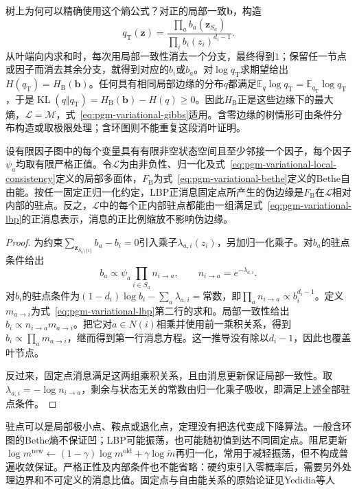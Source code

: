 树上为何可以精确使用这个熵公式？对正的局部一致$\bm b$，构造
\[
  q_{\mathrm T}(\bm z)=
    \frac{\prod_a b_a(\bm z_{S_a})}
         {\prod_i b_i(z_i)^{d_i-1}}.
\]
从叶端向内求和时，每次用局部一致性消去一个分支，最终得到$1$；保留任一节点或因子而消去其余分支，就得到对应的$b_i$或$b_a$。对$\log q_{\mathrm T}$求期望给出$H(q_{\mathrm T})=H_{\mathrm B}(\bm b)$。任何具有相同局部边缘的分布$q$都满足$\mathbb E_q\log q_{\mathrm T}=\mathbb E_{q_{\mathrm T}}\log q_{\mathrm T}$，于是$\operatorname{KL}(q\Vert q_{\mathrm T})=H_{\mathrm B}(\bm b)-H(q)\geq0$。因此$H_{\mathrm B}$正是这些边缘下的最大熵，$\mathcal L=\mathcal M$，式~\eqref{eq:pgm-variational-gibbs}适用。含零边缘的树情形可由条件分布构造或取极限处理；含环图则不能重复这段消叶证明。

\begin{theorem}[正消息固定点与Bethe驻点]
  \label{thm:pgm-variational-bp-stationary}
  设有限因子图中的每个变量具有有限非空状态空间且至少邻接一个因子，每个因子$\psi_a$均取有限严格正值。令$\mathcal L$为由非负性、归一化及式~\eqref{eq:pgm-variational-local-consistency}定义的局部多面体，$F_{\mathrm B}$为式~\eqref{eq:pgm-variational-bethe}定义的Bethe自由能。按任一固定正归一化约定，LBP正消息固定点所产生的伪边缘是$F_{\mathrm B}$在$\mathcal L$相对内部的驻点。反之，$\mathcal L$中的每个正内部驻点都能由一组满足式~\eqref{eq:pgm-variational-lbp}的正消息表示，消息的正比例缩放不影响伪边缘。
\end{theorem}
\begin{proof}
  为约束$\sum_{\bm z_{S_a\setminus\{i\}}}b_a-b_i=0$引入乘子$\lambda_{a,i}(z_i)$，另加归一化乘子。对$b_a$的驻点条件给出
  \[
    b_a\propto\psi_a\prod_{i\in S_a}n_{i\to a},
    \qquad n_{i\to a}=e^{-\lambda_{a,i}}.
  \]
  对$b_i$的驻点条件为$(1-d_i)\log b_i-\sum_a\lambda_{a,i}=\text{常数}$，即$\prod_a n_{i\to a}\propto b_i^{d_i-1}$。定义$m_{a\to i}$为式~\eqref{eq:pgm-variational-lbp}第二行的求和。局部一致性给出$b_i\propto n_{i\to a}m_{a\to i}$。把它对$a\in N(i)$相乘并使用前一乘积关系，得到$b_i\propto\prod_a m_{a\to i}$，继而得到第一行消息方程。这一推导没有除以$d_i-1$，因此也覆盖叶节点。

  反过来，固定点消息满足这两组乘积关系，且由消息更新保证局部一致性。取$\lambda_{a,i}=-\log n_{i\to a}$，剩余与状态无关的常数由归一化乘子吸收，即满足上述全部驻点条件。
\end{proof}

驻点可以是局部极小点、鞍点或退化点，定理没有把迭代变成下降算法。一般含环图的Bethe熵不保证凹；LBP可能振荡，也可能随初值到达不同固定点。阻尼更新$\log m^{\mathrm{new}}\leftarrow(1-\gamma)\log m^{\mathrm{old}}+\gamma\log\widetilde m$再归一化，常用于减轻振荡，但不构成普遍收敛保证。严格正性及内部条件也不能省略：硬约束引入零概率后，需要另外处理边界和不可定义的消息比值。固定点与自由能关系的原始论证见Yedidia等人

